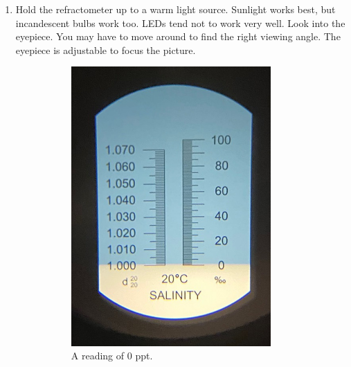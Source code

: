 \documentclass{report}
\begin{document}
\begin{enumerate}
\begin{enumerate}[I]
        \item Hold the refractometer up to a warm light source. Sunlight works best, but incandescent bulbs work too. LEDs 
        tend not to work very well. Look into the eyepiece. You may have to move around to find the right viewing angle. The eyepiece is 
        adjustable to focus the picture. 
        \begin{figure}[H]
            \centering
            \begin{subfigure}{0.5\textwidth}
                \centering
                \includegraphics[width=0.9\textwidth]{RefractometerReading.jpg}
                \caption{A reading of 0 ppt.}
            \end{subfigure}%
            \begin{subfigure}{0.5\textwidth}
                \centering

\end{subfigure}
\end{figure}
\end{enumerate}
\end{enumerate}
\end{document}

